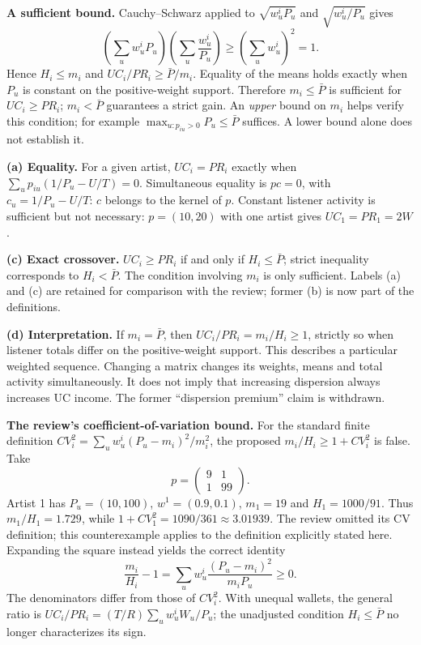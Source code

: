 \documentclass[11pt]{article}
\newcommand{\Pbar}{\bar P}
\begin{document}
\textbf{A sufficient bound.} Cauchy--Schwarz applied to
$\sqrt{w^i_uP_u}$ and $\sqrt{w^i_u/P_u}$ gives
\[
\left(\sum_u w^i_uP_u\right)\left(\sum_u\frac{w^i_u}{P_u}\right)
\ge\left(\sum_u w^i_u\right)^2=1.
\]
Hence $H_i\le m_i$ and $UC_i/PR_i\ge\Pbar/m_i$. Equality of the means
holds exactly when $P_u$ is constant on the positive-weight support.
Therefore $m_i\le\Pbar$ is sufficient for $UC_i\ge PR_i$;
$m_i<\Pbar$ guarantees a strict gain. An \emph{upper} bound on $m_i$ helps
verify this condition; for example $\max_{u:p_{iu}>0}P_u\le\Pbar$ suffices.
A lower bound alone does not establish it.

\textbf{(a) Equality.} For a given artist, $UC_i=PR_i$ exactly when
$\sum_u p_{iu}(1/P_u-U/T)=0$. Simultaneous equality is $pc=0$, with
$c_u=1/P_u-U/T$: $c$ belongs to the kernel of $p$. Constant listener
activity is sufficient but not necessary: $p=(10,20)$ with one artist
gives $UC_1=PR_1=2W$.

\textbf{(c) Exact crossover.} $UC_i\ge PR_i$ if and only if $H_i\le\Pbar$;
strict inequality corresponds to $H_i<\Pbar$. The condition involving
$m_i$ is only sufficient. Labels (a) and (c) are retained for comparison
with the review; former (b) is now part of the definitions.

\textbf{(d) Interpretation.} If $m_i=\Pbar$, then $UC_i/PR_i=m_i/H_i\ge1$,
strictly so when listener totals differ on the positive-weight support.
This describes a particular weighted sequence. Changing a matrix changes
its weights, means and total activity simultaneously. It does not imply
that increasing dispersion always increases UC income. The former
``dispersion premium'' claim is withdrawn.

\textbf{The review's coefficient-of-variation bound.} For the standard
finite definition $CV_i^2=\sum_u w^i_u(P_u-m_i)^2/m_i^2$, the proposed
$m_i/H_i\ge1+CV_i^2$ is false. Take
\[
p=\begin{pmatrix}9&1\\1&99\end{pmatrix}.
\]
Artist 1 has $P_u=(10,100)$, $w^1=(0.9,0.1)$, $m_1=19$ and
$H_1=1000/91$. Thus $m_1/H_1=1.729$, while
$1+CV_1^2=1090/361\approx3.01939$. The review omitted its CV definition;
this counterexample applies to the definition explicitly stated here.
Expanding the square instead yields the correct identity
\[
\frac{m_i}{H_i}-1
=\sum_u w^i_u\frac{(P_u-m_i)^2}{m_iP_u}\ge0.
\]
The denominators differ from those of $CV_i^2$.
With unequal wallets, the general ratio is
$UC_i/PR_i=(T/R)\sum_u w^i_uW_u/P_u$; the unadjusted condition
$H_i\le\Pbar$ no longer characterizes its sign.
\end{document}
